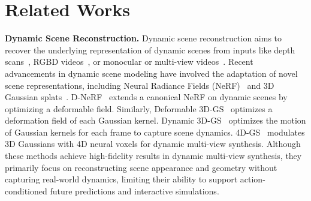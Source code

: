 \section{Related Works}

\textbf{Dynamic Scene Reconstruction.} 
Dynamic scene reconstruction aims to recover the underlying representation of dynamic scenes from inputs like depth scans~\cite{curless1996volumetric, li2008global}, RGBD videos~\cite{newcombe2015dynamicfusion}, or monocular or multi-view videos~\cite{attal2023hyperreel, kratimenos2024dynmf, li2023dynibar, luiten2024dynamic, park2021nerfies, park2021hypernerf, pumarola2021d, wang2023flow, xian2021space, yu2023dylin, yu2024cogs, tretschk2021nonrigid, chu2022physics}. Recent advancements in dynamic scene modeling have involved the adaptation of novel scene representations, including Neural Radiance Fields (NeRF)~\cite{guan2022neurofluid, driess2023learning, li2023pac, li20223d, li2021neural, li2023dynibar, park2021nerfies, park2021hypernerf, pumarola2021d, tretschk2021non, wang2023flow, guo2023forward, cao2023hexplane, fridovich2023k, gao2022monocular, li2021neural, xian2021space, tretschk2021nonrigid, chu2022physics, peng2021CageNeRF} and 3D Gaussian splats~\cite{luiten2024dynamic, wu20244d, yang2024deformable, huang2024sc, kratimenos2024dynmf, lin2024gaussian, yu2024cogs, yang2023real, duan20244d}. D-NeRF~\cite{pumarola2021d} extends a canonical NeRF on dynamic scenes by optimizing a deformable field. Similarly, Deformable 3D-GS~\cite{yang2024deformable} optimizes a deformation field of each Gaussian kernel. Dynamic 3D-GS~\cite{luiten2024dynamic} optimizes the motion of Gaussian kernels for each frame to capture scene dynamics. 4D-GS~\cite{wu20244d} modulates 3D Gaussians with 4D neural voxels for dynamic multi-view synthesis. Although these methods achieve high-fidelity results in dynamic multi-view synthesis, they primarily focus on reconstructing scene appearance and geometry without capturing real-world dynamics, limiting their ability to support action-conditioned future predictions and interactive simulations.

